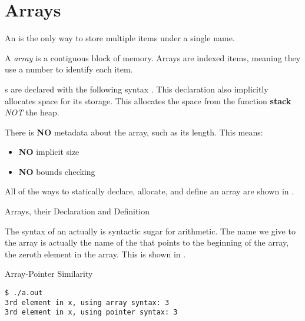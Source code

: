 \section{Arrays}\label{sec:Arrays}
An  is the only way to store multiple items under a single name.

\begin{definition}[Array]\label{def:Array}
  A \emph{array} is a contiguous block of memory.
  Arrays are indexed items, meaning they use a number to identify each item.
\end{definition}

s are declared with the following syntax .
This declaration also implicitly allocates space for its storage.
This allocates the space from the function \textbf{stack} \textit{NOT} the heap.

There is \textbf{NO} metadata about the array, such as its length.
This means:
\begin{itemize}[noitemsep]
\item \textbf{NO} implicit size
\item \textbf{NO} bounds checking
\end{itemize}

All of the ways to statically declare, allocate, and define an array are shown in .

\begin{listing}[h!tbp]
\caption{Arrays, their Declaration and Definition}
\label{lst:Arrays}
\end{listing}

The syntax of an  actually is syntactic sugar for  arithmetic.
The name we give to the array is actually the name of the \textbf{} that points to the beginning of the array, the zeroth element in the array.
This is shown in .

\begin{listing}[h!tbp]
\caption{Array-Pointer Similarity}
\label{lst:Array_Pointer_Similarity}
\begin{verbatim}
$ ./a.out
3rd element in x, using array syntax: 3
3rd element in x, using pointer syntax: 3
\end{verbatim}
\end{listing}

